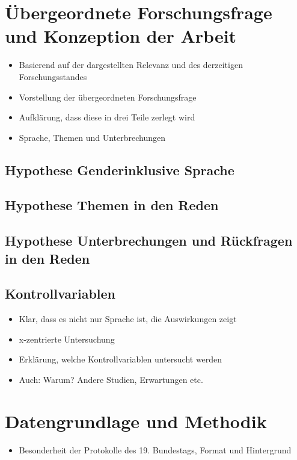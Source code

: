 \documentclass[12pt, 
    twoside=false, 
    bibliography=totoc, 
    numbers=endperiod, 
    headings=normal, 
    toc=chapterentrydotfill
    ]{scrbook}
\begin{document}
\chapter{Übergeordnete Forschungsfrage und Konzeption der Arbeit}
\begin{itemize}
    \item Basierend auf der dargestellten Relevanz und des derzeitigen Forschungsstandes
    \item Vorstellung der übergeordneten Forschungsfrage
    \item Aufklärung, dass diese in drei Teile zerlegt wird
    \item Sprache, Themen und Unterbrechungen
\end{itemize}

\section{Hypothese Genderinklusive Sprache}

\section{Hypothese Themen in den Reden}

\section{Hypothese Unterbrechungen und Rückfragen in den Reden}

\section{Kontrollvariablen}
\begin{itemize}
    \item Klar, dass es nicht nur Sprache ist, die Auswirkungen zeigt
    \item x-zentrierte Untersuchung
    \item Erklärung, welche Kontrollvariablen untersucht werden
    \item Auch: Warum? Andere Studien, Erwartungen etc.
\end{itemize}

\chapter{Datengrundlage und Methodik}
\begin{itemize}
    \item Besonderheit der Protokolle des 19. Bundestags, Format und Hintergrund
\end{itemize}
\end{document}
